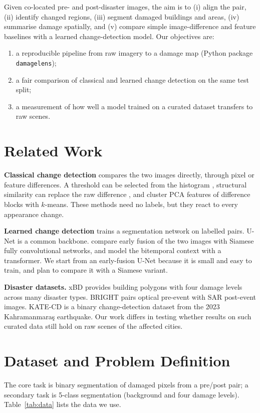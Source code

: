 \documentclass[14pt]{article}
\begin{document}
Given co-located pre- and post-disaster images, the aim is to (i) align the pair, (ii) identify changed regions, (iii) segment damaged buildings and areas, (iv) summarise damage spatially, and (v) compare simple image-difference and feature baselines with a learned change-detection model. Our objectives are:
\begin{enumerate}
    \item a reproducible pipeline from raw imagery to a damage map (Python package \texttt{damagelens});
    \item a fair comparison of classical and learned change detection on the same test split;
    \item a measurement of how well a model trained on a curated dataset transfers to raw scenes.
\end{enumerate}

\section{Related Work}
\textbf{Classical change detection} compares the two images directly, through pixel or feature differences. A threshold can be selected from the histogram \citep{otsu1979}, structural similarity can replace the raw difference \citep{wang2004ssim}, and \citet{celik2009pca} cluster PCA features of difference blocks with $k$-means. These methods need no labels, but they react to every appearance change.

\textbf{Learned change detection} trains a segmentation network on labelled pairs. U-Net \citep{ronneberger2015unet} is a common backbone. \citet{daudt2018siamese} compare early fusion of the two images with Siamese fully convolutional networks, and \citet{chen2022bit} model the bitemporal context with a transformer. We start from an early-fusion U-Net because it is small and easy to train, and plan to compare it with a Siamese variant.

\textbf{Disaster datasets.} xBD \citep{gupta2019xbd} provides building polygons with four damage levels across many disaster types. BRIGHT \citep{chen2025bright} pairs optical pre-event with SAR post-event images. KATE-CD \citep{musaoglu2025kate} is a binary change-detection dataset from the 2023 Kahramanmara\c{s} earthquake. Our work differs in testing whether results on such curated data still hold on raw scenes of the affected cities.

\section{Dataset and Problem Definition}
The core task is binary segmentation of damaged pixels from a pre/post pair; a secondary task is 5-class segmentation (background and four damage levels). Table~\ref{tab:data} lists the data we use.
\end{document}
